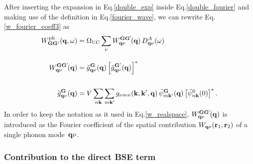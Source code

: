 %
After inserting the expansion in Eq.\;\eqref{double_exp} inside Eq.\;\eqref{double_fourier} and making use of the definition in Eq.\;\eqref{fourier_wave}, we can rewrite Eq.\;\eqref{w_fourier_coeff3} as
%
\begin{subequations}\label{w_fourier_set}
\begin{align}
   W^\text{ph}_{\mathbf{G}\mathbf{G}'}(\mathbf{q},\omega) & = \Omega_\text{UC} \sum_\nu   W_{\mathbf{q}\nu}^{\mathbf{G}\mathbf{G}'}\!(\mathbf{q})\,D^A_{\mathbf{q}\nu}(\omega) \label{w_fourier_final}\\[10pt]
    W_{\mathbf{q}\nu}^{\mathbf{G}\mathbf{G}'}\!(\mathbf{q}) & =\Tilde{g}_{\mathbf{q}\nu}^{\mathbf{G}}(\mathbf{q})\left[\Tilde{g}_{\mathbf{q}\nu}^{\mathbf{G}'}(\mathbf{q})\right]^* \label{w_fourier_spatial} \\[16pt]
   \Tilde{g}_{\mathbf{q}\nu}^{\mathbf{G}}(\mathbf{q}) & = V\sum_{n\mathbf{k}}\sum_{m\mathbf{k'}}g_{\nu mn}(\mathbf{k,k',q}) \,\Tilde{\psi}_{m\mathbf{k}'}^{\mathbf{G}}(\mathbf{q}) \left[\Tilde{\psi}_{n\mathbf{k}}^{0}(0)\right]^*\label{g_fourier_final}.
   \end{align}
\end{subequations}
%
In order to keep the notation as it used in  Eq.\;\eqref{w_realspace}, $ W_{\mathbf{q}\nu}^{\mathbf{G}\mathbf{G}'}\!(\mathbf{q})$ is introduced as the Fourier coefficient of the spatial contribution $W_{\mathbf{q}\nu}(\mathbf{r}_1,\mathbf{r}_2)$ of a single phonon mode~$\mathbf{q}\nu$. 

\subsubsection{Contribution to the direct BSE term}\label{dir_int_ph}

